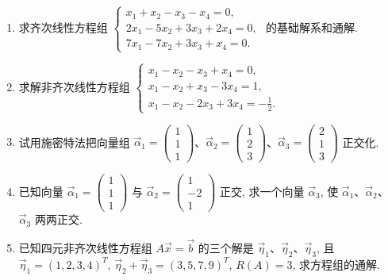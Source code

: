 \begin{enumerate}
	
	\item 求齐次线性方程组
	$
	\begin{cases}
		x_1 + x_2 - x_3 - x_4 = 0, \\
		2x_1 - 5x_2 + 3x_3 + 2x_4 = 0, \\
		7x_1 - 7x_2 + 3x_3 + x_4 = 0.
	\end{cases}
	$
	的基础解系和通解.
	
	
	
	\item 求解非齐次线性方程组
	$
	\begin{cases}
		x_1 - x_2 - x_3 + x_4 = 0, \\
		x_1 - x_2 + x_3 - 3x_4 = 1, \\
		x_1 - x_2 - 2x_3 + 3x_4 = -\frac{1}{2}.
	\end{cases}
	$
	
	
	\item 试用施密特法把向量组 $\vec{\alpha}_1 = \begin{pmatrix} 1 \\ 1 \\ 1 \end{pmatrix}$、$\vec{\alpha}_2 = \begin{pmatrix} 1 \\ 2 \\ 3 \end{pmatrix}$、$\vec{\alpha}_3 = \begin{pmatrix} 2 \\ 1 \\ 3 \end{pmatrix}$ 正交化.
	
	
	\item 已知向量 $\vec{\alpha}_1 = \begin{pmatrix} 1 \\ 1 \\ 1 \end{pmatrix}$ 与 $\vec{\alpha}_2 = \begin{pmatrix} 1 \\ -2 \\ 1 \end{pmatrix}$ 正交, 求一个向量 $\vec{\alpha}_3$, 使 $\vec{\alpha}_1$、$\vec{\alpha}_2$、$\vec{\alpha}_3$ 两两正交.
	
	
	
	\item 已知四元非齐次线性方程组 $A\vec{x} = \vec{b}$ 的三个解是 $\vec{\eta}_1$、$\vec{\eta}_2$、$\vec{\eta}_3$, 且
	$\vec{\eta}_1 = (1, 2, 3, 4)^T$, $\vec{\eta}_2 + \vec{\eta}_3 = (3, 5, 7, 9)^T$, $R(A)=3$, 求方程组的通解.
	

\end{enumerate}
